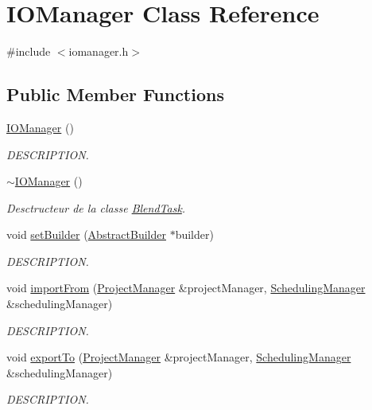 \hypertarget{class_i_o_manager}{}\section{I\+O\+Manager Class Reference}
\label{class_i_o_manager}


{\ttfamily \#include $<$iomanager.\+h$>$}

\subsection*{Public Member Functions}
\begin{DoxyCompactItemize}
\item 
\hyperlink{class_i_o_manager_afce14d2f016545728fee1e48b74f431c}{I\+O\+Manager} ()
\begin{DoxyCompactList}\small\item\em D\+E\+S\+C\+R\+I\+P\+T\+I\+O\+N. \end{DoxyCompactList}\item 
\hyperlink{class_i_o_manager_aa1263e627ea878bbba9406b9b38f60d8}{$\sim$\+I\+O\+Manager} ()
\begin{DoxyCompactList}\small\item\em Desctructeur de la classe \hyperlink{class_blend_task}{Blend\+Task}. \end{DoxyCompactList}\item 
void \hyperlink{class_i_o_manager_a8749170a4bbcd5a1cdb397b63896181b}{set\+Builder} (\hyperlink{class_abstract_builder}{Abstract\+Builder} $\ast$builder)
\begin{DoxyCompactList}\small\item\em D\+E\+S\+C\+R\+I\+P\+T\+I\+O\+N. \end{DoxyCompactList}\item 
void \hyperlink{class_i_o_manager_aeaed53eded828c1eee9709833684abbc}{import\+From} (\hyperlink{class_project_manager}{Project\+Manager} \&project\+Manager, \hyperlink{class_scheduling_manager}{Scheduling\+Manager} \&scheduling\+Manager)
\begin{DoxyCompactList}\small\item\em D\+E\+S\+C\+R\+I\+P\+T\+I\+O\+N. \end{DoxyCompactList}\item 
void \hyperlink{class_i_o_manager_ad7f15fc0812eec610acf28a4090ad30a}{export\+To} (\hyperlink{class_project_manager}{Project\+Manager} \&project\+Manager, \hyperlink{class_scheduling_manager}{Scheduling\+Manager} \&scheduling\+Manager)
\begin{DoxyCompactList}\small\item\em D\+E\+S\+C\+R\+I\+P\+T\+I\+O\+N. \end{DoxyCompactList}\end{DoxyCompactItemize}


